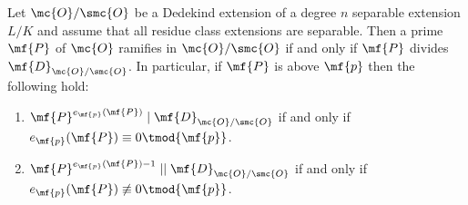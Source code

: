     \begin{theorem}\label{thm:ramifies_if_and_only_if_divides_the_different}
      Let \(\mc{O}/\smc{O}\) be a Dedekind extension of a degree \(n\) separable extension \(L/K\) and assume that all residue class extensions are separable. Then a prime \(\mf{P}\) of \(\mc{O}\) ramifies in \(\mc{O}/\smc{O}\) if and only if \(\mf{P}\) divides \(\mf{D}_{\mc{O}/\smc{O}}\). In particular, if \(\mf{P}\) is above \(\mf{p}\) then the following hold:
      \begin{enumerate}[label*=(\roman*)]
        \item \(\mf{P}^{e_{\mf{p}}(\mf{P})} \mid \mf{D}_{\mc{O}/\smc{O}}\) if and only if \(e_{\mf{p}}(\mf{P}) \equiv 0 \tmod{\mf{p}}\).
        \item \(\mf{P}^{e_{\mf{p}}(\mf{P})-1} \mid\mid \mf{D}_{\mc{O}/\smc{O}}\) if and only if \(e_{\mf{p}}(\mf{P}) \not\equiv 0 \tmod{\mf{p}}\).
      \end{enumerate}
    \end{theorem}
